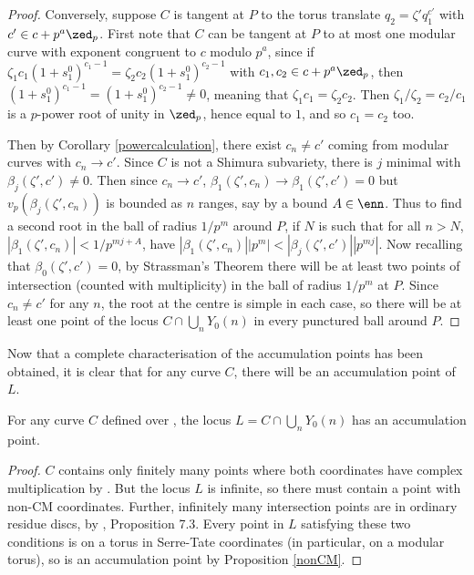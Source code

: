 \documentclass[12pt,letterpaper]{article}
\begin{document}
\begin{proof}
		
		Conversely, suppose $C$ is tangent at $P$ to the torus translate $q_2 = \zeta'q_1^{c'}$ with $c'\in c+p^a\zed_p$. First note that $C$ can be tangent at $P$ to at most one modular curve with exponent congruent to $c$ modulo $p^a$, since if $\zeta_1 c_1(1+s_1^0)^{c_1-1}=\zeta_2 c_2(1+s_1^0)^{c_2-1}$ with $c_1,c_2\in c+p^a\zed_p$, then $(1+s_1^0)^{c_1-1}=(1+s_1^0)^{c_2-1}\ne0$, meaning that $\zeta_1c_1=\zeta_2c_2$. Then $\zeta_1/\zeta_2=c_2/c_1$ is a $p$-power root of unity in $\zed_p$, hence equal to $1$, and so $c_1 =c_2$ too.
		
		
		Then by Corollary \ref{powercalculation}, there exist $c_n\ne c'$ coming from modular curves with $c_n\to c'$. Since $C$ is not a Shimura subvariety, there is $j$ minimal with $\beta_j(\zeta',c')\ne0$. Then since $c_n\to c'$, $\beta_1(\zeta',c_n)\to \beta_1(\zeta',c')=0$ but $v_p(\beta_j(\zeta',c_n))$ is bounded as $n$ ranges, say by a bound $A\in \enn$. Thus to find a second root in the ball of radius $1/p^m$ around $P$, if $N$ is such that for all $n>N$, $|\beta_1(\zeta',c_n)|<1/p^{mj+A}$, have $|\beta_1(\zeta',c_n)||p^m|<|\beta_j(\zeta',c')||p^{mj}|$. Now recalling that $\beta_0(\zeta',c')=0$, by Strassman's Theorem there will be at least two points of intersection (counted with multiplicity) in the ball of radius $1/p^m$ at $P$.	Since $c_n\ne c'$ for any $n$, the root at the centre is simple in each case, so there will be at least one point of the locus $C\cap \bigcup_nY_0(n)$ in every punctured ball around $P$.	
	\end{proof}
	
	Now that a complete characterisation of the accumulation points has been obtained, it is clear that for any curve $C$, there will be an accumulation point of $L$.
	
	\begin{cor} \label{always}
		For any curve $C$ defined over \cp, the locus $L =C\cap \bigcup_nY_0(n)$ has an accumulation point.
	\end{cor}
	
	\begin{proof}
		$C$ contains only finitely many points where both coordinates have complex multiplication by \cite{And98}. But the locus $L$ is infinite, so there must contain a point with non-CM coordinates.
		Further, infinitely many intersection points are in ordinary residue discs, by \cite{CO06}, Proposition 7.3. Every point in $L$ satisfying these two conditions is on a torus in Serre-Tate coordinates (in particular, on a modular torus), so is an accumulation point by Proposition \ref{nonCM}.
	\end{proof}
	
\end{document}
